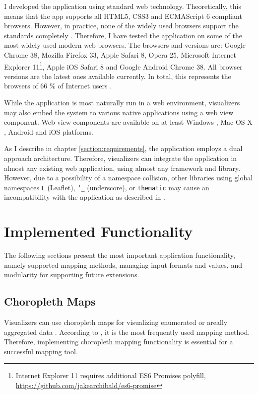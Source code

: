 I developed the application using standard web technology. Theoretically, this means that the app supports all HTML5, CSS3 and ECMAScript 6 compliant browsers. However, in practice, none of the widely used browsers support the standards completely \citep{manian_html5_2011}. Therefore, I have tested the application on some of the most widely used modern web browsers. The browsers and versions are: Google Chrome 38, Mozilla Firefox 33, Apple Safari 8, Opera 25, Microsoft Internet Explorer 11\footnote{Internet Explorer 11 requires additional ES6 Promises polyfill, \url{https://github.com/jakearchibald/es6-promise}}, Apple iOS Safari 8 and Google Android Chrome 38. All browser versions are the latest ones available currently. In total, this represents the browsers of 66 \% of Internet users \citep{statcounter_globalstats_2014}.

While the application is most naturally run in a web environment, visualizers may also embed the system to various native applications using a web view component. Web view components are available on at least Windows \citep{small_ten_2012}, Mac OS X \citep{hunter_why_2014}, Android \citep{google_building_2014} and iOS \citep{apple_uiwebview_2014} platforms.

As I describe in chapter \ref{section:requirements}, the application employs a dual approach architecture. Therefore, visualizers can integrate the application in almost any existing web application, using almost any framework and library. However, due to a possibility of a namespace collision, other libraries using global namespaces \texttt{L} (Leaflet), \texttt{\char`_} (underscore), or \texttt{thematic} may cause an incompatibility with the application as described in \citet{osmani_essential_2011}.

\section{Implemented Functionality}

The following sections present the most important application functionality, namely supported mapping methods, managing input formats and values, and modularity for supporting future extensions.

\subsection{Choropleth Maps}

Visualizers can use choropleth maps for visualizing enumerated or areally aggregated data \citep[chap.~6]{dent_cartography:_2008}. According to \citet[chap.~14]{slocum_thematic_2014}, it is the most frequently used mapping method. Therefore, implementing choropleth mapping functionality is essential for a successful mapping tool.

